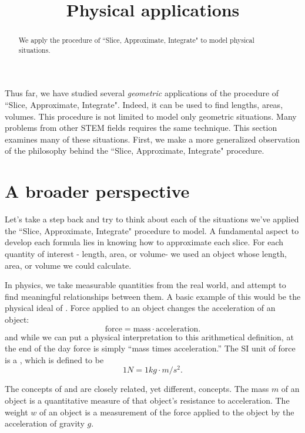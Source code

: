 \documentclass{ximera}
\title[Dig-In:]{Physical applications}
\begin{document}
\begin{abstract}
We apply the procedure of ``Slice, Approximate, Integrate" to model physical situations.
\end{abstract}
\maketitle

Thus far, we have studied several \emph{geometric} applications of the procedure of ``Slice, Approximate, Integrate".  Indeed, it can be used to find lengths, areas, volumes.  This procedure is not limited to model only geometric situations.  Many problems from other STEM fields requires the same technique.  This section examines many of these situations.  First, we make a more generalized observation of the philosophy behind the ``Slice, Approximate, Integrate" procedure.

\section{A broader perspective}
Let's take a step back and try to think about each of the situations we've applied the ``Slice, Approximate, Integrate" procedure to model.  A fundamental aspect to develop each formula lies in knowing how to approximate each slice.  For each quantity of interest - length, area, or volume- we used an object whose length, area, or volume we could calculate.


 In physics, we take measurable quantities from the real world, and
attempt to find meaningful relationships between them. A basic example
of this would be the physical ideal of . Force applied to
an object changes the acceleration of an object:
\[
\mathrm{force} = \mathrm{mass} \cdot \mathrm{acceleration}.
\]
and while we can put a  physical interpretation to this arithmetical
definition, at the end of the day force is simply ``mass times
acceleration.'' The SI unit of force is a , which is
defined to be
\[
1\unit{N} = 1\unit{kg}\cdot \unit{m}/\unit{s}^2. 
\]

\begin{warning}
  The concepts of  and  are closely related, yet
  different, concepts. The mass $m$ of an object is a quantitative
  measure of that object's resistance to acceleration. The weight $w$
  of an object is a measurement of the force applied to the object by
  the acceleration of gravity $g$.
\end{warning}
\end{document}
